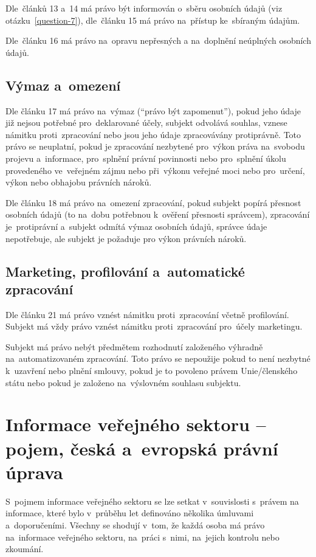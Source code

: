Dle~článků 13 a~14 má právo být informován o~sběru osobních údajů (viz otázku~\ref{question-7}), dle~článku 15 má právo na~přístup ke~sbíraným údajům.

Dle~článku 16 má právo na~opravu nepřesných a na~doplnění neúplných osobních údajů.

\subsection*{Výmaz a~omezení}

Dle článku 17 má právo na~výmaz (\enquote{právo být zapomenut}), pokud jeho údaje již nejsou potřebné pro~deklarované účely, subjekt odvolává souhlas, vznese námitku proti~zpracování nebo jsou jeho údaje zpracovávány protiprávně. Toto právo se neuplatní, pokud je zpracování nezbytené pro~výkon práva na~svobodu projevu a~informace, pro~splnění právní povinnosti nebo pro~splnění úkolu provedeného ve~veřejném zájmu nebo při~výkonu veřejné moci nebo pro~určení, výkon nebo obhajobu právních nároků.

Dle článku 18 má právo na~omezení zpracování, pokud subjekt popírá přesnost osobních údajů (to na~dobu potřebnou k~ověření přesnosti správcem), zpracování je~protiprávní a~subjekt odmítá výmaz osobních údajů, správce údaje nepotřebuje, ale subjekt je požaduje pro výkon právních nároků.

\subsection*{Marketing, profilování a~automatické zpracování}

Dle článku 21 má právo vznést námitku proti~zpracování včetně profilování. Subjekt má vždy právo vznést námitku proti~zpracování pro~účely marketingu.

Subjekt má právo nebýt předmětem rozhodnutí založeného výhradně na~automatizovaném zpracování. Toto právo se nepoužije pokud to není nezbytné k~uzavření nebo plnění smlouvy, pokud je to povoleno právem Unie/členského státu nebo pokud je založeno na~výslovném souhlasu subjektu.

\clearpage
\section{Informace veřejného sektoru -- pojem, česká a~evropská právní úprava}

S~pojmem informace veřejného sektoru se lze setkat v~souvislosti s~právem na informace, které bylo v~průběhu let definováno několika úmluvami a~doporučeními. Všechny se shodují v~tom, že každá osoba má právo na~informace veřejného sektoru, na~práci s~nimi, na~jejich kontrolu nebo zkoumání.

